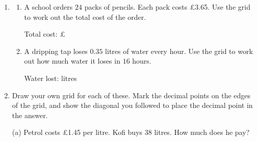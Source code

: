 \documentclass[12pt,a4paper]{article}
\newcommand{\ansline}[1][2.2cm]{\underline{\hspace{#1}}}
\newcommand{\lsetup}[2]{%
  \edef\lC{\the\numexpr#1\relax}\edef\lR{\the\numexpr#2\relax}%
  \edef\lCm{\the\numexpr#1-1\relax}\edef\lRm{\the\numexpr#2-1\relax}}
\newcommand{\lgrid}{%
  \draw[thick] (0,0) rectangle (\lC,\lR);
  \foreach \i in {1,...,\lCm}{\draw (\i,0) -- (\i,\lR);}
  \foreach \j in {1,...,\lRm}{\draw (0,\j) -- (\lC,\j);}
  \foreach \i in {1,...,\lC}{\foreach \j in {1,...,\lR}{%
    \draw[gray!75] ({\i-1},{\j-1}) -- (\i,\j);}}}
\newcommand{\ltop}[2]{\node[font=\small] at ({#1-0.5},{\lR+0.34}) {#2};}
\newcommand{\lside}[2]{\node[font=\small] at ({\lC+0.34},{\lR-#1+0.5}) {#2};}
\newcommand{\lanslines}{%
  \foreach \j in {1,...,\lR}{\draw[gray!60] (-0.74,{\lR-\j+0.28}) -- (-0.14,{\lR-\j+0.28});}
  \foreach \i in {1,...,\lC}{\draw[gray!60] ({\i-0.8},-0.6) -- ({\i-0.2},-0.6);}}
\newcommand{\ltopdot}[1]{\fill (#1,{\lR+0.2}) circle (1.8pt);}
\newcommand{\lsidedot}[1]{\fill ({\lC+0.34},{\lR-#1}) circle (1.8pt);}
\begin{document}
\begin{enumerate}[resume]

\item
\begin{enumerate}
  \item A school orders $24$ packs of pencils. Each pack costs \pounds3.65.
        Use the grid to work out the total cost of the order.
        \vspace{2pt}

        \begin{center}
        \end{center}
        \vspace{2pt}
        Total cost: \pounds\ansline[2.5cm]

  \item A dripping tap loses $0.35$ litres of water every hour. Use the grid
        to work out how much water it loses in $16$ hours.
        \vspace{2pt}

        \begin{center}
        \end{center}
        \vspace{2pt}
        Water lost: \ansline[2.5cm] litres
\end{enumerate}

\newpage

\item Draw your own grid for each of these. Mark the decimal points on the
edges of the grid, and show the diagonal you followed to place the decimal
point in the answer.
\vspace{2pt}

\begin{minipage}[t]{0.46\linewidth}
(a) Petrol costs \pounds1.45 per litre. Kofi buys $38$ litres. How much does
he pay?


\end{minipage}
\end{enumerate}
\end{document}
